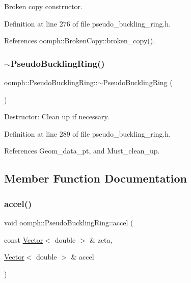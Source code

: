 Broken copy constructor. 



Definition at line 276 of file pseudo\+\_\+buckling\+\_\+ring.\+h.



References oomph\+::\+Broken\+Copy\+::broken\+\_\+copy().

\mbox{\label{classoomph_1_1PseudoBucklingRing_a1b1c4cc24f5bd87654ae62f44e4fa547}} 
\subsubsection{\texorpdfstring{$\sim$\+Pseudo\+Buckling\+Ring()}{~PseudoBucklingRing()}}
{\footnotesize\ttfamily oomph\+::\+Pseudo\+Buckling\+Ring\+::$\sim$\+Pseudo\+Buckling\+Ring (\begin{DoxyParamCaption}{ }\end{DoxyParamCaption})\hspace{0.3cm}{\ttfamily [inline]}}



Destructor\+: Clean up if necessary. 



Definition at line 289 of file pseudo\+\_\+buckling\+\_\+ring.\+h.



References Geom\+\_\+data\+\_\+pt, and Must\+\_\+clean\+\_\+up.



\subsection{Member Function Documentation}
\mbox{\label{classoomph_1_1PseudoBucklingRing_ae983ed12da7311457a4a2d4f1c3f8b6c}} 
\subsubsection{\texorpdfstring{accel()}{accel()}}
{\footnotesize\ttfamily void oomph\+::\+Pseudo\+Buckling\+Ring\+::accel (\begin{DoxyParamCaption}\item[{const \hyperlink{classoomph_1_1Vector}{Vector}$<$ double $>$ \&}]{zeta,  }\item[{\hyperlink{classoomph_1_1Vector}{Vector}$<$ double $>$ \&}]{accel }\end{DoxyParamCaption})\hspace{0.3cm}{\ttfamily [inline]}}



